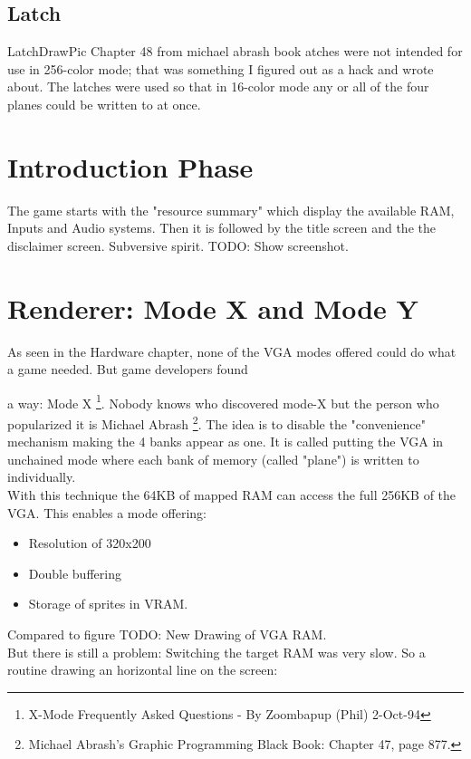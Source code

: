 \subsection{Latch}
LatchDrawPic
Chapter 48 from michael abrash book
atches were not intended for use in 256-color mode; that was something I figured out as a hack and wrote about. The latches were used so that in 16-color mode any or all of the four planes could be written to at once.






\section{Introduction Phase}


The game starts with the "resource summary" which display the available RAM, Inputs and Audio systems. Then it is followed by the title screen and the the disclaimer screen. Subversive spirit.
TODO: Show screenshot.

\section{Renderer: Mode X and Mode Y}
As seen in the Hardware chapter, none of the VGA modes offered could do what a game needed. But game developers found

a way: Mode X \footnote{X-Mode Frequently Asked Questions - By Zoombapup (Phil)  2-Oct-94}. Nobody knows who discovered mode-X but the person who popularized it is Michael Abrash \footnote{Michael Abrash's Graphic Programming Black Book: Chapter 47, page 877.}. The idea is to disable the "convenience" mechanism making the 4 banks appear as one. It is called putting the VGA in unchained mode where each bank of memory (called "plane") is written to individually.\\
With this technique the 64KB of mapped RAM can access the full 256KB of the VGA. This enables a mode offering:
\begin{itemize}
	\item Resolution of 320x200
	\item Double buffering
	\item Storage of sprites in VRAM.
\end{itemize}

Compared to figure 
TODO: New Drawing of VGA RAM.\\
But there is still a problem: Switching the target RAM was very slow. So a routine drawing an horizontal line on the screen:


